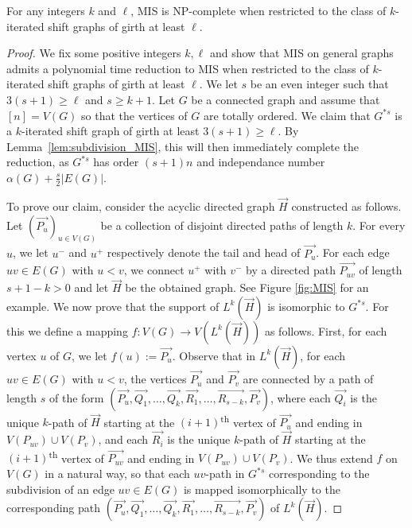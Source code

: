 \documentclass[11pt,a4aper]{article}
\renewcommand{\ge}{\geqslant}
\DeclareRobustCommand*{\ora}{\overrightarrow}
\newcommand*{\orH}{\ora{H}}
\newcommand*{\MIS}
{\textsc{MIS} }
\newcommand{\clement}[1]{{\color{orange} CL: #1}}
\newcommand{\ugo}[1]{{\color{red} UG: #1}}
\begin{document}
\begin{proposition}
  For any integers $k$ and $\ell$, \MIS is NP-complete when restricted to the class of
  $k$-iterated shift graphs of girth at least $\ell$.
\end{proposition}
\begin{proof}
  We fix some positive integers $k,\ell$ 
  and show that \MIS on general graphs admits a polynomial time reduction to \MIS
  when restricted to the class of $k$-iterated shift graphs of girth at least
  $\ell$. We let $s$ be an even integer such that $3(s+1) \ge \ell$ and
  $s \ge k+1$. Let $G$ be a connected graph and assume that $[n]=V(G)$ so that
  the vertices of $G$ are totally ordered. We
  claim that $G^{\ast s}$ is a $k$-iterated shift graph of girth at least
  $3(s+1) \ge \ell$. By Lemma~\ref{lem:subdivision_MIS}, this will then immediately complete the reduction, as $G^{\ast s}$ has order $(s+1)n$ and independance number $\alpha(G)+\tfrac{s}{2}|E(G)|$.

  To prove our claim, consider the acyclic directed graph $\orH$ constructed as follows. Let
  $(\ora{P_u})_{u \in V(G)}$ be a collection of disjoint directed paths of length
  $k$. For every $u$, we let $u^-$ and $u^+$ respectively denote the tail and head of
  $\ora{P_u}$. For each edge $uv \in E(G)$ with $u < v$, we connect $u^+$ with $v^-$ by a
  directed path $\ora{P_{uv}}$ of length $s+1 -k > 0$ and let $\orH$ be the obtained graph.  See Figure \ref{fig:MIS} for an example. 
  We now prove that the support of $L^k(\orH)$ is isomorphic to $G^{\ast s}$. For this we define a mapping $f: V(G)\to V(L^k(\orH))$ as follows. First, for each vertex $u$ of $G$,  we let $f(u):=\ora{P_u}$. Observe that in $L^k(\orH)$,
  for each $uv \in E(G)$ with $u < v$, the vertices $\ora{P_u}$ and $\ora{P_v}$ are
  connected by a path of length $s$ of the form $(\ora{P_u}, \ora{Q_1}, \dots, \ora{Q_k}, \ora{R_1}, \dots, \ora{R_{s-k}}, \ora{P_v})$, where
  each $\ora{Q_i}$ is the unique $k$-path of $\orH$ starting at the $(i+1)$\textsuperscript{th} vertex
  of $\ora{P_u}$ and ending in $V(P_{uv}) \cup V(P_v)$, and each $\ora{R_i}$ is the unique $k$-path of $\orH$
  starting at the $(i+1)$\textsuperscript{th} vertex of $\ora{P_{uv}}$ and ending in
  $V(P_{uv}) \cup V(P_v)$. We thus extend $f$ on $V(G)$ in a natural way, so that each $uv$-path in $G^{\ast s}$ corresponding to the subdivision of an edge $uv\in E(G)$ is mapped isomorphically to the corresponding path $(\ora{P_u}, \ora{Q_1}, \dots, \ora{Q_k}, \ora{R_1}, \dots, \ora{R_{s-k}}, \ora{P_v})$ of $L^k(\orH)$.
  

\end{proof}
\end{document}
